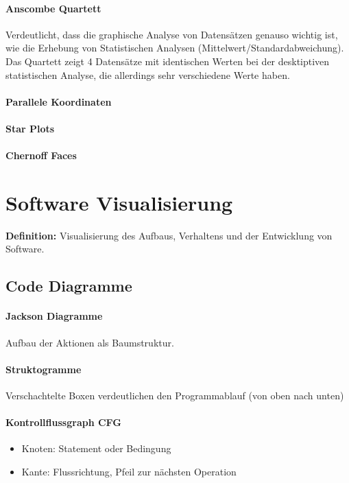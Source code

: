 \documentclass[ngerman]{scrartcl}
\begin{document}
\paragraph{Anscombe Quartett} Verdeutlicht, dass die graphische Analyse von Datensätzen genauso wichtig ist, wie die Erhebung von Statistischen Analysen (Mittelwert/Standardabweichung). Das Quartett zeigt 4 Datensätze mit identischen Werten bei der desktiptiven statistischen Analyse, die allerdings sehr verschiedene Werte haben.

\paragraph{Parallele Koordinaten} 

\paragraph{Star Plots} 

\paragraph{Chernoff Faces}

\section{Software Visualisierung}
\textbf{Definition:} Visualisierung des Aufbaus, Verhaltens und der Entwicklung von Software.

\subsection{Code Diagramme}
\paragraph{Jackson Diagramme} Aufbau der Aktionen als Baumstruktur. 

\paragraph{Struktogramme} Verschachtelte Boxen verdeutlichen den Programmablauf (von oben nach unten)

\paragraph{Kontrollflussgraph CFG}
\begin{itemize}
  \item Knoten: Statement oder Bedingung
  \item Kante: Flussrichtung, Pfeil zur nächsten Operation
\end{itemize} 
\end{document}
